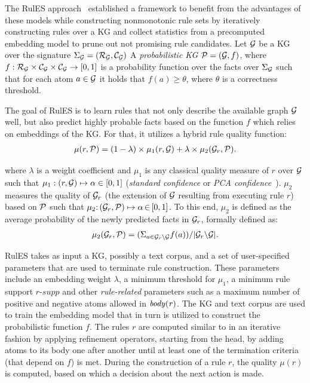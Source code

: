 The RulES approach~\cite{thinh2018} established a framework to benefit from the advantages of these models while constructing nonmonotonic rule sets by iteratively constructing rules over a KG and collect statistics from a precomputed embedding model to prune out not promising rule candidates.
Let  $\mathcal{G}$ be a KG over the signature $\Sigma_{\mathcal{G}}=(\mathcal{R}_{\mathcal{G}},\mathcal{C}_{\mathcal{G}})$
A \emph{probabilistic KG} $\mathcal{P} = (\mathcal{G},f)$, 
where $f:\mathcal{R}_{\mathcal{G}}\times \mathcal{C}_{\mathcal{G}} \times \mathcal{C}_{\mathcal{G}}\rightarrow [0,1]$ is a probability function over the facts over $\Sigma_{\mathcal{G}}$ such that for each atom $a \in \mathcal{G} $ it holds that $f(a) \geq \theta $, where $\theta$ is a correctness threshold.

The goal of RulES is to learn rules that not only describe the available graph $\mathcal{G}$ well, but also predict highly probable facts based on the function $f$ which relies on embeddings of the KG. For that, it utilizes a hybrid rule quality function:
\begin{align*}
	\mu(r,\mathcal{P})= (1 - \lambda)\times \mu_1(r,\mathcal{G}) + \lambda \times \mu_2(\mathcal{G}_r,\mathcal{P}).
\end{align*}

where $\lambda$ is a weight coefficient and $\mu_1$ is any classical quality measure of $r$ over $\mathcal{G}$ such that $\mu_1: (r,\mathcal{G}) \mapsto \alpha \in  [0,1]$ (\eg \textit{standard confidence} or \textit{PCA confidence}~\cite{amie}). 
$\mu_2$ measures the quality of $\mathcal{G}_r$ (\ie the extension of $\mathcal{G}$ resulting from executing rule $r$) based on $\mathcal{P}$ such that
 $\mu_2{:}\, (\mathcal{G}_r,\mathcal{P}) \mapsto  \alpha \,{\in}\, [0,1]$. To this end, $\mu_2$ is defined as the average probability of the newly predicted facts in $\mathcal{G}_r$, formally defined as:
\begin{align*}
	\mu_2(\mathcal{G}_r,\mathcal{P}) = (\Sigma_{a\in \mathcal{G}_r\backslash \mathcal{G}} f(a)) /
				|\mathcal{G}_r \backslash \mathcal{G}|.
\end{align*}



RulES takes as input a KG, possibly a text corpus, and a set of user-specified parameters that are used to terminate rule construction.
These parameters include an embedding weight $\lambda$, 
a minimum threshold 
for $\mu_1$,  
a minimum rule support $\textit{r-supp}$ 
and other \emph{rule-related} parameters such as a maximum number of positive %
and negative 
atoms allowed in $\mathit{body(r)}$.
The KG and text corpus are used to train the embedding model that in turn is utilized to construct the probabilistic function $f$.
The rules $r$ are computed similar to \cite{amie} in an iterative fashion by applying refinement operators, starting from the head, by adding atoms to its body one after another until at least one of the termination criteria (that depend on $f$) is met. During the construction of a rule $r$, the quality $\mu(r)$ is computed, based on which a decision about the next action is made.

